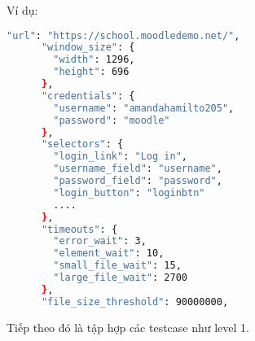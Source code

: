 \noindent Ví dụ:
\begin{lstlisting}[language=bash, breaklines=true]
      "url": "https://school.moodledemo.net/",
      "window_size": {
        "width": 1296,
        "height": 696
      },
      "credentials": {
        "username": "amandahamilto205",
        "password": "moodle"
      },
      "selectors": {
        "login_link": "Log in",
        "username_field": "username",
        "password_field": "password",
        "login_button": "loginbtn"
        ....
      },
      "timeouts": {
        "error_wait": 3,
        "element_wait": 10,
        "small_file_wait": 15,
        "large_file_wait": 2700
      },
      "file_size_threshold": 90000000,
\end{lstlisting}
\vspace{10pt}
\noindent Tiếp theo đó là tập hợp các testcase như level 1.